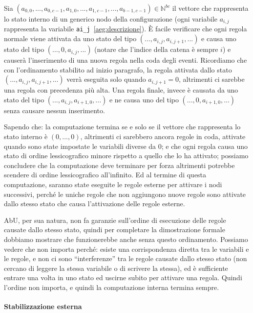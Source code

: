 \documentclass[12pt, a4paper]{article}
\begin{document}
    Sia $(a_{0,0},...,a_{0,c-1},a_{1,0},...,a_{1,c-1},...,a_{b-1,c-1})\in \mathbb{N}^{bc}$ il vettore che rappresenta lo stato interno di un generico nodo della configurazione (ogni variabile $a_{i,j}$ rappresenta la variabile \lstinline{ai_j}~\ref{aeg:descrizione}). È facile verificare che ogni regola normale viene attivata da uno stato del tipo $(...,a_{i,j},a_{i,j+1},...)$ e causa uno stato del tipo $(...,0,a_{i,j},...)$ (notare che l'indice della catena è sempre $i$) e causerà l'inserimento di una nuova regola nella coda degli eventi.
    Ricordiamo che con l'ordinamento stabilito ad inizio paragrafo, la regola attivata dallo stato $(...,a_{i,j},a_{i,j+1},...)$ verrà eseguita solo quando $a_{i,j+1}=0$, altrimenti ci sarebbe una regola con precedenza più alta.
    Una regola finale, invece è causata da uno stato del tipo $(...,a_{i,j},a_{i+1,0},...)$ e ne causa uno del tipo $(...,0,a_{i+1,0},...)$ senza causare nessun inserimento.

    Sapendo che: la computazione termina se e solo se il vettore che rappresenta lo stato interno è $(0,...,0)$, altrimenti ci sarebbero ancora regole in coda, attivate quando sono state impostate le variabili diverse da $0$; e che ogni regola causa uno stato di ordine lessicografico minore rispetto a quello che lo ha attivato; possiamo concludere che la computazione deve terminare per forza altrimenti potrebbe scendere di ordine lessicografico all'infinito.
    Ed al termine di questa computazione, saranno state eseguite le regole esterne per attivare i nodi successivi, perché le uniche regole che non aggiungono nuove regole sono attivate dallo stesso stato che causa l'attivazione delle regole esterne.

    AbU, per sua natura, non fa garanzie sull'ordine di esecuzione delle regole causate dallo stesso stato, quindi per completare la dimostrazione formale dobbiamo mostrare che funzionerebbe anche senza questo ordinamento.
    Possiamo vedere che non importa perché: esiste una corrispondenza diretta tra le variabili e le regole, e non ci sono ``interferenze'' tra le regole causate dallo stesso stato (non cercano di leggere la stessa variabile o di scrivere la stessa), ed è sufficiente entrare una volta in uno stato ed uscirne subito per attivare una regola.
    Quindi l'ordine non importa, e quindi la computazione interna termina sempre.\label{terminazione:interna:ordinamento}

    \paragraph{Stabilizzazione esterna}
\end{document}
